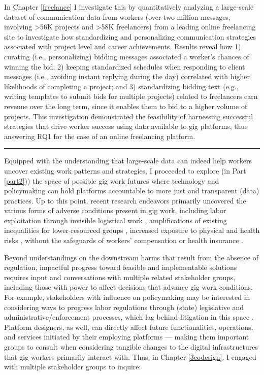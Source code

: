 In Chapter \ref{freelance} I investigate this by quantitatively analyzing a large-scale dataset of communication data from workers (over two million messages, involving >56K projects and >58K freelancers) from a leading online freelancing site to investigate how standardizing and personalizing communication strategies associated with project level and career achievements. 
Results reveal how 1) curating (i.e., personalizing) bidding messages associated a worker's chances of winning the bid; 2) keeping standardized schedules when responding to client messages (i.e., avoiding instant replying during the day) correlated with higher likelihoods of completing a project; and 3) standardizing bidding text (e.g., writing templates to submit bids for multiple projects) related to freelancers earn revenue over the long term, since it enables them to bid to a higher volume of projects. This investigation demonstrated the feasibility of harnessing successful strategies that drive worker success using data available to gig platforms, thus answering RQ1 for the case of an online freelancing platform.

\vspace{1em}
\hrule
\vspace{1em}

Equipped with the understanding that large-scale data can indeed help workers uncover existing work patterns and strategies, I proceeded to explore (in Part \ref{part2})) the space of possible gig work futures where technology and policymaking can hold platforms accountable to more just and transparent (data) practices. Up to this point, recent research endeavors primarily uncovered the various forms of adverse conditions present in gig work, including labor exploitation through invisible logistical work \cite{regulate, capitalism, ming2024wage, cole2024wage}, amplifications of existing inequalities for lower-resourced groups \cite{participation, creativity, disruption, ma2022brush, Galperin2021-eh}, increased exposure to physical and health risks \cite{rc6G, body, Kerr_undated-zw,jbho,8xYL, geschwindt2022biking, rc6G,dCmn}, without the safeguards of workers' compensation or health insurance \cite{rc6G,xMHW}.

Beyond understandings on the downstream harms that result from the absence of regulation, impactful progress toward feasible and implementable solutions requires input and conversations with multiple related stakeholder groups, including those with power to affect decisions that advance gig work conditions. 
For example, stakeholders with influence on policymaking may be interested in considering ways to progress labor regulations through (state) legislative and administrative/enforcement processes, which lag behind litigation in this space \cite{regulate, collier2018disrupting, bernhardt2010broken}. Platform designers, as well, can directly affect future functionalities, operations, and services initiated by their employing platforms --- making them important groups to consult when considering tangible changes to the digital infrastructures that gig workers primarily interact with. Thus, in Chapter \ref{3codesign}, I engaged with multiple stakeholder groups to inquire:

